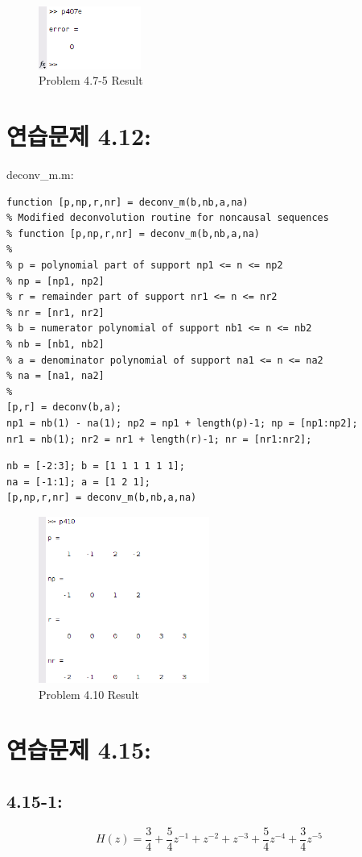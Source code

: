 \documentclass[11pt
  , a4paper
  , article
  , oneside
]{memoir}
\begin{document}
\begin{figure}[h!]
	\centering
	\includegraphics[width=0.3\textwidth,height=0.1\textwidth]{./images/p407e.png}
	\caption{Problem 4.7-5 Result}
	\label{fig:Problem 4.7-5 Result}
\end{figure}

\chapter{연습문제 4.12: }
deconv\_m.m:
\begin{lstlisting}[style=termstyle]
function [p,np,r,nr] = deconv_m(b,nb,a,na)
% Modified deconvolution routine for noncausal sequences
% function [p,np,r,nr] = deconv_m(b,nb,a,na)
%
% p = polynomial part of support np1 <= n <= np2
% np = [np1, np2]
% r = remainder part of support nr1 <= n <= nr2
% nr = [nr1, nr2]
% b = numerator polynomial of support nb1 <= n <= nb2
% nb = [nb1, nb2]
% a = denominator polynomial of support na1 <= n <= na2
% na = [na1, na2]
%
[p,r] = deconv(b,a);
np1 = nb(1) - na(1); np2 = np1 + length(p)-1; np = [np1:np2];
nr1 = nb(1); nr2 = nr1 + length(r)-1; nr = [nr1:nr2];
\end{lstlisting}

\begin{lstlisting}[style=termstyle]
% Problem 4.10
nb = [-2:3]; b = [1 1 1 1 1 1]; 
na = [-1:1]; a = [1 2 1];
[p,np,r,nr] = deconv_m(b,nb,a,na)
\end{lstlisting}

\begin{figure}[h!]
	\centering
	\includegraphics[width=0.5\textwidth,height=0.25\textwidth]{./images/p410.png}
	\caption{Problem 4.10 Result}
	\label{fig:Problem 4.10 Result}
\end{figure}

\chapter{연습문제 4.15: }
\section{4.15-1: }
\begin {equation}
H(z) = \frac{3}{4}+\frac{5}{4}z^{-1}+z^{-2}+z^{-3}+\frac{5}{4}z^{-4}+\frac{3}{4}z^{-5}
\end {equation}
\end{document}

